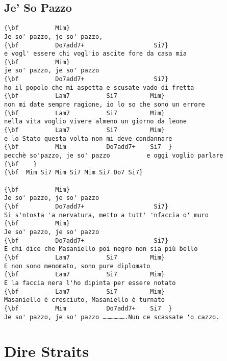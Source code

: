 \documentclass[a4paper]{article}
\begin{document}
\subsection{Je' So Pazzo}
\begin{Verbatim}[commandchars=\\\{\}]
{\bf          Mim}
Je so' pazzo, je so' pazzo,
{\bf          Do7add7+                   Si7}
e vogl' essere chi vogl'io ascite fore da casa mia
{\bf          Mim}
je so' pazzo, je so' pazzo
{\bf          Do7add7+                   Si7}
ho il popolo che mi aspetta e scusate vado di fretta
{\bf          Lam7          Si7         Mim}
non mi date sempre ragione, io lo so che sono un errore
{\bf          Lam7          Si7         Mim}
nella vita voglio vivere almeno un giorno da leone
{\bf          Lam7          Si7         Mim}
e lo Stato questa volta non mi deve condannare
{\bf          Mim           Do7add7+    Si7  }
pecchè so'pazzo, je so' pazzo          e oggi voglio parlare
{\bf    }
{\bf  Mim Si7 Mim Si7 Mim Si7 Do7 Si7}

{\bf          Mim}
Je so' pazzo, je so' pazzo
{\bf          Do7add7+                   Si7}
Si s'ntosta 'a nervatura, metto a tutt' 'nfaccia o' muro
{\bf          Mim}
Je so' pazzo, je so' pazzo
{\bf          Do7add7+                   Si7}
E chi dice che Masaniello poi negro non sia più bello
{\bf          Lam7          Si7         Mim}
E non sono menomato, sono pure diplomato
{\bf          Lam7          Si7         Mim}
E la faccia nera l'ho dipinta per essere notato
{\bf          Lam7          Si7         Mim}
Masaniello è cresciuto, Masaniello è turnato
{\bf          Mim           Do7add7+    Si7  }
Je so' pazzo, je so' pazzo ……………….Nun ce scassate 'o cazzo.

\end{Verbatim}
\newpage
\section{Dire Straits}
\end{document}
